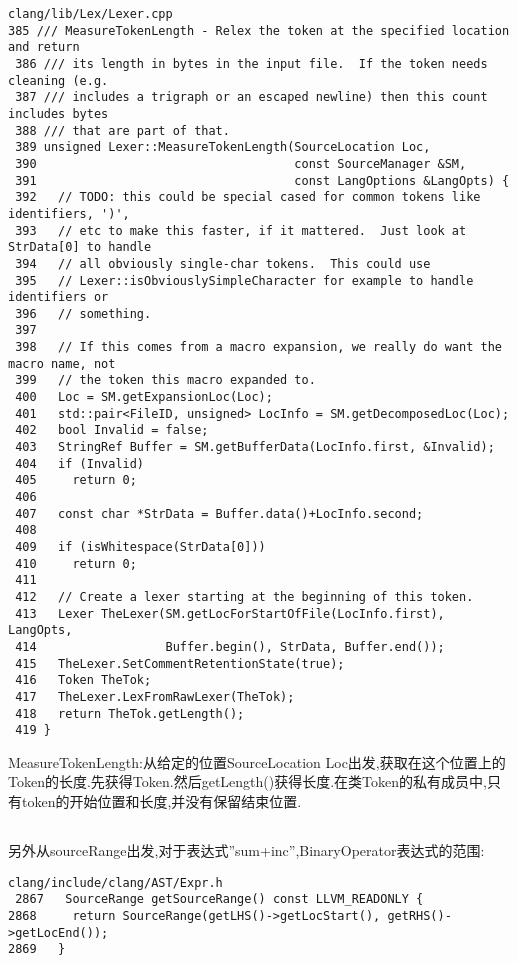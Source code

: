 \begin{lstlisting}
clang/lib/Lex/Lexer.cpp
385 /// MeasureTokenLength - Relex the token at the specified location and return 
 386 /// its length in bytes in the input file.  If the token needs cleaning (e.g. 
 387 /// includes a trigraph or an escaped newline) then this count includes bytes 
 388 /// that are part of that.      
 389 unsigned Lexer::MeasureTokenLength(SourceLocation Loc, 
 390                                    const SourceManager &SM, 
 391                                    const LangOptions &LangOpts) { 
 392   // TODO: this could be special cased for common tokens like identifiers, ')', 
 393   // etc to make this faster, if it mattered.  Just look at StrData[0] to handle 
 394   // all obviously single-char tokens.  This could use 
 395   // Lexer::isObviouslySimpleCharacter for example to handle identifiers or 
 396   // something. 
 397  
 398   // If this comes from a macro expansion, we really do want the macro name, not 
 399   // the token this macro expanded to. 
 400   Loc = SM.getExpansionLoc(Loc);    
 401   std::pair<FileID, unsigned> LocInfo = SM.getDecomposedLoc(Loc); 
 402   bool Invalid = false;             
 403   StringRef Buffer = SM.getBufferData(LocInfo.first, &Invalid); 
 404   if (Invalid) 
 405     return 0; 
 406  
 407   const char *StrData = Buffer.data()+LocInfo.second; 
 408  
 409   if (isWhitespace(StrData[0]))     
 410     return 0;                       
 411 
 412   // Create a lexer starting at the beginning of this token. 
 413   Lexer TheLexer(SM.getLocForStartOfFile(LocInfo.first), LangOpts, 
 414                  Buffer.begin(), StrData, Buffer.end()); 
 415   TheLexer.SetCommentRetentionState(true); 
 416   Token TheTok; 
 417   TheLexer.LexFromRawLexer(TheTok); 
 418   return TheTok.getLength(); 
 419 }
\end{lstlisting}
\par{MeasureTokenLength:从给定的位置SourceLocation Loc出发,获取在这个位置上的Token的长度.先获得Token.然后getLength()获得长度.在类Token的私有成员中,只有token的开始位置和长度,并没有保留结束位置.}

\subsection{}

另外从sourceRange出发,对于表达式”sum+inc”,BinaryOperator表达式的范围:
\begin{lstlisting}
clang/include/clang/AST/Expr.h
 2867   SourceRange getSourceRange() const LLVM_READONLY {
2868     return SourceRange(getLHS()->getLocStart(), getRHS()->getLocEnd());
2869   }
\end{lstlisting}

